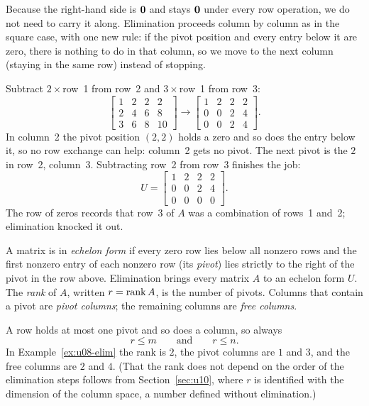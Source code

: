 Because the right-hand side is $\boldsymbol{0}$ and stays $\boldsymbol{0}$ under every row operation, we do not
need to carry it along. Elimination proceeds column by column as in the square case, with one
new rule: if the pivot position and every entry below it are zero, there is nothing to do in
that column, so we move to the next column (staying in the same row) instead of stopping.

\begin{example}\label{ex:u08-elim}
Subtract $2\times$row~1 from row~2 and $3\times$row~1 from row~3:
\[
\begin{bmatrix}1&2&2&2\\2&4&6&8\\3&6&8&10\end{bmatrix}\longrightarrow
\begin{bmatrix}1&2&2&2\\0&0&2&4\\0&0&2&4\end{bmatrix}.
\]
In column~2 the pivot position $(2,2)$ holds a zero and so does the entry below it, so no row
exchange can help: column~2 gets no pivot. The next pivot is the $2$ in row~2, column~3.
Subtracting row~2 from row~3 finishes the job:
\[
U=\begin{bmatrix}\boxed{1}&2&2&2\\0&0&\boxed{2}&4\\0&0&0&0\end{bmatrix}.
\]
The row of zeros records that row~3 of $A$ was a combination of rows~1 and~2; elimination
knocked it out.
\end{example}

\begin{definition}\label{def:u08-rank}
A matrix is in \emph{echelon form} if every zero row lies below all nonzero rows and the first
nonzero entry of each nonzero row (its \emph{pivot}) lies strictly to the right of the pivot in
the row above. Elimination brings every matrix $A$ to an echelon form $U$. The \emph{rank} of
$A$, written $r=\operatorname{rank} A$, is the number of pivots. Columns that contain a pivot are
\emph{pivot columns}; the remaining columns are \emph{free columns}.
\end{definition}

A row holds at most one pivot and so does a column, so always
\[
r\le m\qquad\text{and}\qquad r\le n.
\]
In Example~\ref{ex:u08-elim} the rank is $2$, the pivot columns are $1$ and $3$, and the free
columns are $2$ and $4$. (That the rank does not depend on the order of the elimination steps
follows from Section~\ref{sec:u10}, where $r$ is identified with the dimension of the column
space, a number defined without elimination.)

